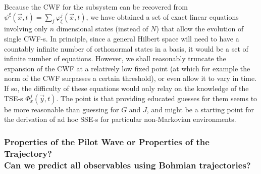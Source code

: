 \documentclass[11pt, a4paper]{article} %
\begin{document}
Because the CWF for the subsystem can be recovered from $\psi^\xi(\vec{x},t)=\sum_j \varphi^j_\xi(\vec{x},t)$, we have obtained a set of exact linear equations involving only $n$ dimensional states (instead of $N$) that allow the evolution of single CWF-s. In principle, since a general Hilbert space will need to have a countably infinite number of orthonormal states in a basis, it would be a set of infinite number of equations. However, we shall reasonably truncate the expansion of the CWF at a relatively low fixed point (at which for example the norm of the CWF surpasses a certain threshold), or even allow it to vary in time. If so, the difficulty of these equations would only relay on the knowledge of the TSE-s $\Phi^j_x(\vec{y},t)$. The point is that providing educated guesses for them seems to be more reasonable than guessing for $G$ and $J$, and might be a starting point for the derivation of ad hoc SSE-s for particular non-Markovian environments.  \vspace{-0.2cm}

 
\subsubsection*{Properties of the Pilot Wave or Properties of the Trajectory? \\ Can we predict all observables using Bohmian trajectories?}
\end{document}

